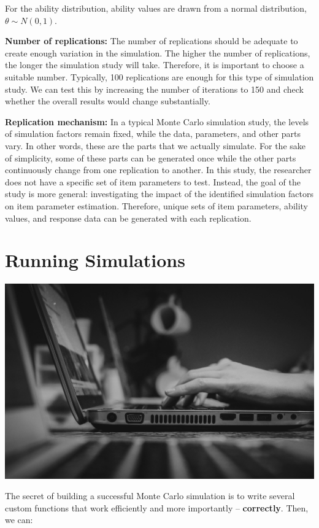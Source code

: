 \documentclass[
]{book}
\begin{document}
For the ability distribution, ability values are drawn from a normal distribution, \(\theta \sim N(0, 1)\).

\textbf{Number of replications:} The number of replications should be adequate to create enough variation in the simulation. The higher the number of replications, the longer the simulation study will take. Therefore, it is important to choose a suitable number. Typically, 100 replications are enough for this type of simulation study. We can test this by increasing the number of iterations to 150 and check whether the overall results would change substantially.

\textbf{Replication mechanism:} In a typical Monte Carlo simulation study, the levels of simulation factors remain fixed, while the data, parameters, and other parts vary. In other words, these are the parts that we actually simulate. For the sake of simplicity, some of these parts can be generated once while the other parts continuously change from one replication to another. In this study, the researcher does not have a specific set of item parameters to test. Instead, the goal of the study is more general: investigating the impact of the identified simulation factors on item parameter estimation. Therefore, unique sets of item parameters, ability values, and response data can be generated with each replication.

\hypertarget{run}{%
\chapter{Running Simulations}\label{run}}

\includegraphics{figure/john-schnobrich-yFbyvpEGHFQ-unsplash.jpg}

The secret of building a successful Monte Carlo simulation is to write several custom functions that work efficiently and more importantly -- \textbf{correctly}. Then, we can:
\end{document}
